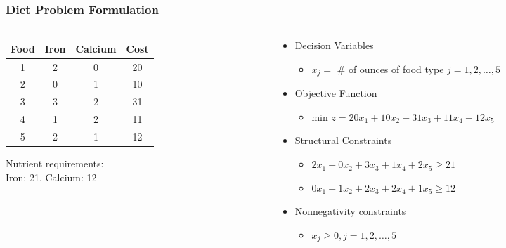 \documentclass[12pt,handout]{beamer}
\begin{document}
\begin{frame}
\frametitle{Diet Problem Formulation}
\begin{columns}[t]
\begin{column}{5cm}
\begin{center}
\begin{tabular} {c | c | c | c}
Food & Iron & Calcium & Cost \\
\hline
1 & 2 & 0 & 20 \\
2 & 0 & 1 & 10 \\
3 & 3 & 2 & 31 \\
4 & 1 & 2 & 11 \\
5 & 2 & 1 & 12 \\
\end{tabular}
\end{center}
Nutrient requirements: \\ Iron: 21, Calcium: 12
\end{column}
\begin{column}{7cm}
\begin{itemize}
\item Decision Variables
    \begin{itemize}
    \item $x_j = $ \# of ounces of food type $j = 1, 2, \ldots, 5$
    \end{itemize}
\item Objective Function
    \begin{itemize}
    \item min $z = 20 x_1 + 10 x_2 + 31 x_3 + 11 x_4 + 12 x_5$
    \end{itemize}
\item Structural Constraints
    \begin{itemize}
    \item $2 x_1 + 0 x_2 + 3 x_3 + 1 x_4 + 2 x_5 \ge 21$
    \item $0 x_1 + 1 x_2 + 2 x_3 + 2 x_4 + 1 x_5 \ge 12$
    \end{itemize}
\item Nonnegativity constraints
    \begin{itemize}
    \item $x_j \ge 0, j = 1, 2, \ldots, 5$
    \end{itemize}
\end{itemize}
\end{column}
\end{columns}
\end{frame}
\end{document}
